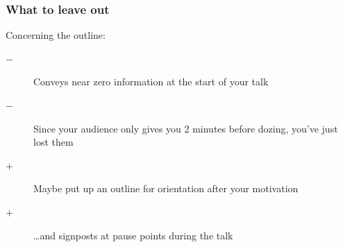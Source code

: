 \documentclass[aspectratio=43,10pt,ucs]{beamer} %
\begin{document}
\begin{frame}
  \frametitle{What to leave out}

  Concerning the \alert{outline}:
  \begin{description}
  \item[$\boldsymbol{-}$] Conveys near zero information at the start
    of your talk
  \item[$\boldsymbol{-}$] Since your audience only gives you 2 minutes
    before dozing, you've just lost them
  \item[$\boldsymbol{+}$] Maybe put up an outline for orientation
    after your motivation
  \item[$\boldsymbol{+}$] \ldots and signposts at pause points during
    the talk
  \end{description}

  \vspace*{2em}


\end{frame}
\end{document}
